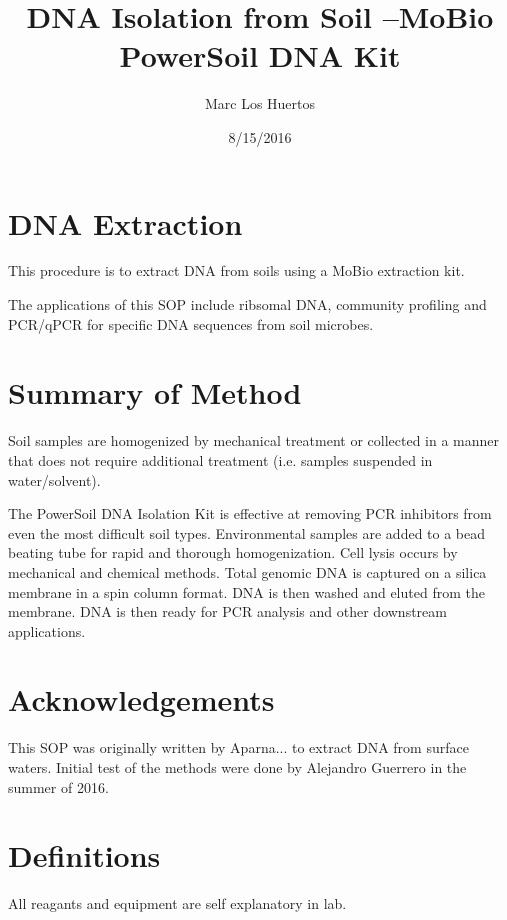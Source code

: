 \documentclass[12pt]{../SOP3_alpha}\usepackage[]{graphicx}\usepackage[]{color}
\title{DNA Isolation from Soil --MoBio PowerSoil DNA Kit}
\date{8/15/2016}
\author{Marc Los Huertos}
\begin{document}

\maketitle

\section{DNA Extraction }

\NP This procedure is to extract DNA from soils using a MoBio extraction kit. 

\NP The applications of this SOP include ribsomal DNA, community profiling and PCR/qPCR for specific DNA sequences from soil microbes. 

\section{Summary of Method}

Soil samples are homogenized by mechanical treatment or collected in a manner that does not require additional treatment (i.e. samples suspended in water/solvent). 

The PowerSoil\textsuperscript{\textregistered} DNA Isolation Kit is effective at removing PCR inhibitors from even
the most difficult soil types. Environmental samples are added to a bead beating
tube for rapid and thorough homogenization. Cell lysis occurs by mechanical and
chemical methods. Total genomic DNA is captured on a silica membrane in a spin
column format. DNA is then washed and eluted from the membrane. DNA is then
ready for PCR analysis and other downstream applications. 

\tableofcontents

\newpage

\section{Acknowledgements}

\NP This SOP was originally written by Aparna... to extract DNA from surface waters. Initial test of the methods were done by Alejandro Guerrero in the summer of 2016. 

\section{Definitions}

\NP All reagants and equipment are self explanatory in lab. 
\end{document}
